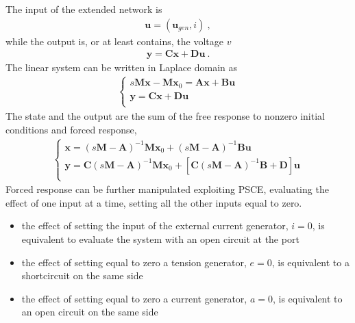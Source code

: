 \documentclass[letterpaper,10pt,italian]{jupyterBook}
\begin{document}
\sphinxAtStartPar
The input of the extended network is
\begin{equation*}
\begin{split}\mathbf{u} = ( \mathbf{u}_{gen}, i ) \ ,\end{split}
\end{equation*}
\sphinxAtStartPar
while the output is, or at least contains, the voltage \(v\)
\begin{equation*}
\begin{split}\mathbf{y} = \mathbf{C} \mathbf{x} + \mathbf{D} \mathbf{u} \ .\end{split}
\end{equation*}
\sphinxAtStartPar
The linear system can be written in Laplace domain as
\begin{equation*}
\begin{split}\begin{cases}
  s \mathbf{M} \mathbf{x} - \mathbf{M} \mathbf{x}_0  = \mathbf{A} \mathbf{x} + \mathbf{B} \mathbf{u} \\
  \mathbf{y} = \mathbf{C} \mathbf{x} + \mathbf{D} \mathbf{u} \\
\end{cases}\end{split}
\end{equation*}
\sphinxAtStartPar
The state and the output are the sum of the free response to non\sphinxhyphen{}zero initial conditions and forced response,
\begin{equation*}
\begin{split}\begin{cases}
  \mathbf{x} = (s \mathbf{M} - \mathbf{A})^{-1} \mathbf{M} \mathbf{x}_0 + (s \mathbf{M} - \mathbf{A})^{-1} \mathbf{B} \mathbf{u} \\
  \mathbf{y} = \mathbf{C} (s \mathbf{M} - \mathbf{A})^{-1} \mathbf{M} \mathbf{x}_0 + \left[ \mathbf{C} (s \mathbf{M} - \mathbf{A})^{-1} \mathbf{B} + \mathbf{D} \right] \mathbf{u} \\
\end{cases}\end{split}
\end{equation*}
\sphinxAtStartPar
Forced response can be further manipulated exploiting PSCE, evaluating the effect of one input at a time, setting all the other inputs equal to zero.
\begin{itemize}
\item {} 
\sphinxAtStartPar
the effect of setting the input of the external current generator, \(i = 0\), is equivalent to evaluate the system with an open circuit at the port

\item {} 
\sphinxAtStartPar
the effect of setting equal to zero a tension generator, \(e = 0\), is equivalent to a short\sphinxhyphen{}circuit on the same side

\item {} 
\sphinxAtStartPar
the effect of setting equal to zero a current generator, \(a = 0\), is equivalent to an open circuit on the same side

\end{itemize}
\end{document}
